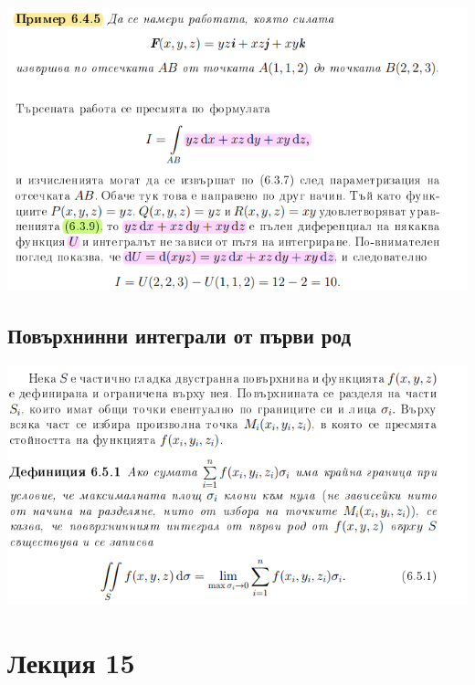 \documentclass[a4paper,fleqn,12pt]{article}
\theoremstyle{definition}
\begin{document}
\begin{center}
  \includegraphics{Pics/calc/lec14-1.png}
\end{center}


\subsection{Повърхнинни интеграли от първи род}
\begin{center}
  \includegraphics{Pics/calc/lec14-2.png}
\end{center}



\newpage
\section{Лекция 15}
\end{document}
